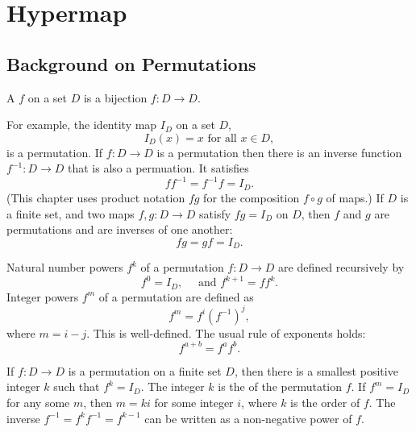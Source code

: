 \chapter{Hypermap}\label{chap:hypermap}
%

\section{Background on Permutations}

\begin{definition}[permutation]
A  $f$ on a set
  $D$ is a bijection $f:D\to D$.
\end{definition}

For example, the identity map $I_D$ on a set $D$,
\begin{displaymath}
I_D(x)=x \text{ for all } x \in D,
\end{displaymath}
 is a permutation.
If $f:D\to D$ is a permutation then there is an inverse function $f^{-1}:D\to D$
that is also a permuation.  
It satisfies
\begin{displaymath}
f f^{-1} = f^{-1} f = I_D.
\end{displaymath}
(This chapter uses product notation $f g$ for the composition $f\circ g$ of maps.)
If $D$ is a finite set, and two maps
$f,g:D\to D$ satisfy $f g = I_D$ on $D$, then $f$ and $g$ are permutations and are
inverses of one another:
\begin{displaymath}
f g = g f = I_D.
\end{displaymath}

Natural number powers  $f^k$ of a permutation $f:D\to D$ are defined
recursively by
\begin{displaymath}
f^0 = I_D,\quad\text{ and } f^{k+1} = f f^k.
\end{displaymath}
Integer powers $f^m$ of a permutation are defined as
$$f^m = f^i (f^{-1})^j,$$ where $m = i -j$.  This is well-defined.
The usual rule of exponents holds:
\begin{displaymath}
f^{a+b} = f^a f^b.
\end{displaymath}

If $f:D\to D$ is a permutation on a finite set $D$, then there is a smallest
positive integer $k$ such that $f^k=I_D$.  The integer $k$ is the 
of the permutation $f$.  If $f^m=I_D$ for any some $m$, then $m = k i$ for some
integer $i$, where $k$ is the order of $f$. The inverse $f^{-1} = f^k f^{-1} = f^{k-1}$ can be written as a
non-negative power of $f$.

